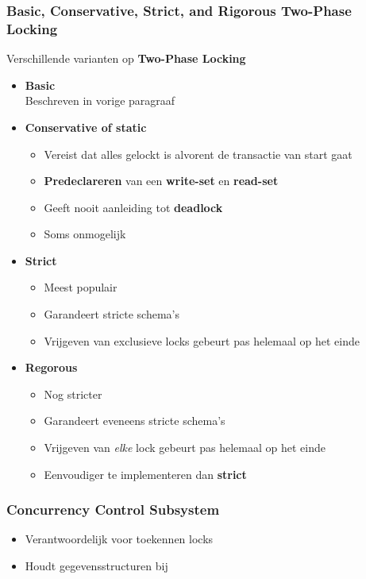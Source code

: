 \subsubsection{Basic, Conservative, Strict, and Rigorous Two-Phase Locking}
Verschillende varianten op \textbf{Two-Phase Locking}
\begin{itemize}
	\item \textbf{Basic} \\
	Beschreven in vorige paragraaf
	\item \textbf{Conservative of static}
	\begin{itemize}
		\item Vereist dat alles gelockt is alvorent de transactie van start gaat
		\item \textbf{Predeclareren} van een \textbf{write-set} en \textbf{read-set}
		\item Geeft nooit aanleiding tot \textbf{deadlock}
		\item Soms onmogelijk
		\end{itemize}
	\item \textbf{Strict}
		\begin{itemize}
		\item Meest populair
		\item Garandeert stricte schema's
		\item Vrijgeven van exclusieve locks gebeurt pas helemaal op het einde
		\end{itemize}
	\item \textbf{Regorous}
		\begin{itemize}
		\item Nog stricter
		\item Garandeert eveneens stricte schema's 
		\item Vrijgeven van \textit{elke} lock gebeurt pas helemaal op het einde
		\item Eenvoudiger te implementeren dan \textbf{strict}
		\end{itemize}	
\end{itemize}

\subsubsection{Concurrency Control Subsystem}
\begin{itemize}
	\item Verantwoordelijk voor toekennen locks
	\item Houdt gegevensstructuren bij
\end{itemize}



